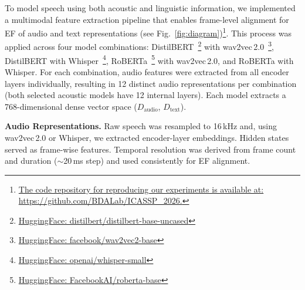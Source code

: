 \documentclass{article}
\begin{document}
{%




To model speech using both acoustic and linguistic information, we implemented a multimodal feature extraction pipeline that enables frame-level alignment for EF of audio and text representations (see Fig.~\ref{fig:diagram})\footnote{\textcolor{black}{\href{https://github.com/BDALab/ICASSP_2026/}{The code repository for reproducing our experiments is available at: https://github.com/BDALab/ICASSP\_2026.}}}. This process was applied across four model combinations: DistilBERT~\cite{sanh2019}\footnote{\href{https://huggingface.co/distilbert/distilbert-base-uncased}{HuggingFace: distilbert/distilbert-base-uncased}} with wav2vec\,2.0~\cite{baevski2020}\footnote{\href{https://huggingface.co/facebook/wav2vec2-base}{HuggingFace: facebook/wav2vec2-base}}, DistilBERT with Whisper~\cite{radford2023}\footnote{\href{https://huggingface.co/openai/whisper-small}{HuggingFace: openai/whisper-small}}, RoBERTa~\cite{liu2019}\footnote{\href{https://huggingface.co/FacebookAI/roberta-base}{HuggingFace: FacebookAI/roberta-base}} with wav2vec\,2.0, and RoBERTa with Whisper. For each combination, audio features were extracted from all encoder layers individually, resulting in 12 distinct audio representations per combination (both selected acoustic models have 12 internal layers). Each model extracts a 768-dimensional dense vector space ($D_\text{audio}$,  $D_\text{text}$).

\textbf{Audio Representations.} Raw speech was resampled to 16\,kHz and, using wav2vec\,2.0 or Whisper, we extracted encoder-layer embeddings. Hidden states served as frame-wise features. Temporal resolution was derived from frame count and duration ($\sim$20\,ms step) and used consistently for EF alignment.


}
\end{document}

